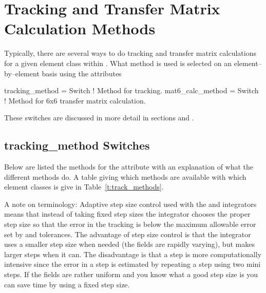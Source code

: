 \chapter{Tracking and Transfer Matrix Calculation Methods}
\label{c:methods}

Typically, there are several ways to do tracking and transfer matrix
calculations for a given element class within \bmad. What method is
used is selected on an element--by--element basis using the attributes
\begin{example}
  tracking_method = Switch   ! Method for tracking.
  mat6_calc_method = Switch  ! Method for 6x6 transfer matrix calculation.
\end{example}
These switches are discussed in more detail in sections  
and .

\section{tracking\_method Switches}
\label{s:tkm}

Below are listed the methods for the 
attribute with an explanation of what the different methods do. A
table giving which methods are available with which element classes is give
in Table~\ref{t:track_methods}. 

A note on terminology: Adaptive step size control used with the
 and  integrators means that 
instead of taking fixed step sizes the integrator chooses the proper
step size so that the error in the tracking is below the maximum
allowable error set by  and  tolerances. The
advantage of step size control is that the integrator uses a smaller
step size when needed (the fields are rapidly varying), but makes
larger steps when it can. The disadvantage is that a step is more
computationally intensive since the error in a step is estimated by
repeating a step using two mini steps. If the fields are rather
uniform and you know what a good step size is you can save time by using
a fixed step size.

